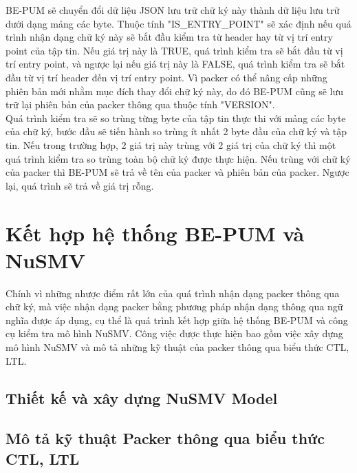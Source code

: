 \hspace{0.5cm}BE-PUM sẽ chuyển đổi dữ liệu JSON lưu trữ chữ ký này thành dữ liệu lưu trữ dưới dạng mảng các byte. Thuộc tính "IS\_ENTRY\_POINT" sẽ xác định nếu quá trình nhận dạng chữ ký này sẽ bắt đầu kiểm tra từ header hay từ vị trí entry point của tập tin. Nếu giá trị này là TRUE, quá trình kiểm tra sẽ bắt đầu từ vị trí entry point, và ngược lại nếu giá trị này là FALSE, quá trình kiểm tra sẽ bắt đầu từ vị trí header đến vị trí entry point. Vì packer có thể nâng cấp những phiên bản mới nhằm mục đích thay đổi chữ ký này, do đó BE-PUM cũng sẽ lưu trữ lại phiên bản của packer thông qua thuộc tính "VERSION".\\ 

\hspace{0.5cm}Quá trình kiểm tra sẽ so trùng từng byte của tập tin thực thi với mảng các byte của chữ ký, bước đầu sẽ tiến hành so trùng ít nhất 2 byte đầu của chữ ký và tập tin. Nếu trong trường hợp, 2 giá trị này trùng với 2 giá trị của chữ ký thì một quá trình kiểm tra so trùng toàn bộ chữ ký được thực hiện. Nếu trùng với chữ ký của packer thì BE-PUM sẽ trả về tên của packer và phiên bản của packer. Ngược lại, quá trình sẽ trả về giá trị rỗng. 

\section{Kết hợp hệ thống BE-PUM và NuSMV}

\hspace{0.5cm}Chính vì những nhược điểm rất lớn của quá trình nhận dạng packer thông qua chữ ký, mà việc nhận dạng packer bằng phương pháp nhận dạng thông qua ngữ nghĩa được áp dụng, cụ thể là quá trình kết hợp giữa hệ thống BE-PUM và công cụ kiểm tra mô hình NuSMV. Công việc được thực hiện bao gồm việc xây dựng mô hình NuSMV và mô tả những kỹ thuật của packer thông qua biểu thức CTL, LTL.\\

\subsection{Thiết kế và xây dựng NuSMV Model}


\subsection{Mô tả kỹ thuật Packer thông qua biểu thức CTL, LTL}

